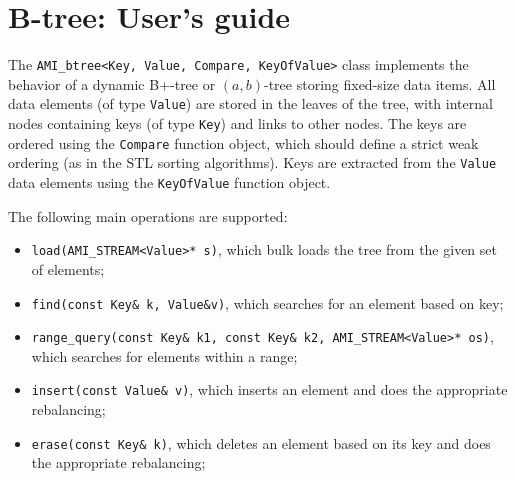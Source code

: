

\chapter{B-tree: User's guide}
\label{btree:overview}
The {\tt AMI\_btree<Key, Value, Compare, KeyOfValue>} class implements the
behavior of a dynamic B+-tree or $(a,b)$-tree storing fixed-size data
items. All data elements (of type {\tt Value}) are stored in the leaves of
the tree, with internal nodes containing keys (of type {\tt Key}) and links
to other nodes. The keys are ordered using the {\tt Compare} function
object, which should define a strict weak ordering (as in the STL sorting
algorithms). Keys are extracted from the {\tt Value} data elements using
the {\tt KeyOfValue} function object.

The following main operations are supported:
\begin{itemize}

  \item {\tt load(AMI\_STREAM<Value>* s)}, which bulk loads the tree from
  the given set of elements;

  \item {\tt find(const Key\& k, Value\&v)}, which searches for an element
  based on key;

  \item {\tt range\_query(const Key\& k1, const Key\& k2,
  AMI\_STREAM<Value>* os)}, which searches for elements within a range;

  \item {\tt insert(const Value\& v)}, which inserts an element and does
  the appropriate rebalancing;

  \item {\tt erase(const Key\& k)}, which deletes an element based on its
  key and does the appropriate rebalancing;
\end{itemize}

